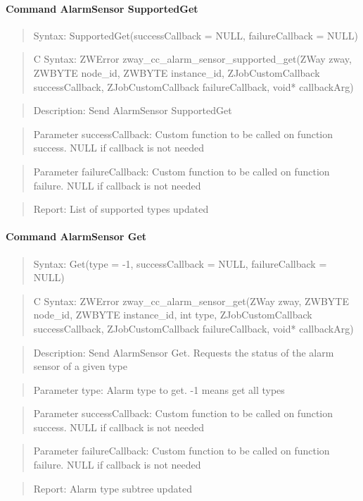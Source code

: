 \paragraph{Command AlarmSensor SupportedGet}
\begin{quote}Syntax: SupportedGet(successCallback = NULL, failureCallback = NULL)\end{quote}
\begin{quote}C Syntax: ZWError zway\_cc\_alarm\_sensor\_supported\_get(ZWay zway, ZWBYTE node\_id, ZWBYTE instance\_id, ZJobCustomCallback successCallback, ZJobCustomCallback failureCallback, void* callbackArg)\end{quote}
\begin{quote}Description: Send AlarmSensor SupportedGet\end{quote}
\begin{quote}Parameter successCallback: Custom function to be called on function success. NULL if callback is not needed\end{quote}
\begin{quote}Parameter failureCallback: Custom function to be called on function failure. NULL if callback is not needed\end{quote}
\begin{quote}Report: List of supported types updated\end{quote}

\paragraph{Command AlarmSensor Get}
\begin{quote}Syntax: Get(type = -1, successCallback = NULL, failureCallback = NULL)\end{quote}
\begin{quote}C Syntax: ZWError zway\_cc\_alarm\_sensor\_get(ZWay zway, ZWBYTE node\_id, ZWBYTE instance\_id, int type, ZJobCustomCallback successCallback, ZJobCustomCallback failureCallback, void* callbackArg)\end{quote}
\begin{quote}Description: Send AlarmSensor Get. Requests the status of the alarm sensor of a given type\end{quote}
\begin{quote}Parameter type: Alarm type to get. -1 means get all types\end{quote}
\begin{quote}Parameter successCallback: Custom function to be called on function success. NULL if callback is not needed\end{quote}
\begin{quote}Parameter failureCallback: Custom function to be called on function failure. NULL if callback is not needed\end{quote}
\begin{quote}Report: Alarm type subtree updated\end{quote}



